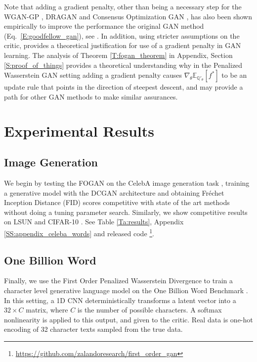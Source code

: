 \documentclass{article}
\begin{document}
 Note that adding a gradient penalty, other than being a necessary step for the WGAN-GP \cite{gulrajani2017improved}, 
 DRAGAN \cite{dragan} and Consensus Optimization GAN \cite{mescheder2017numerics},
 has also been shown empirically to improve the performance the original GAN method (Eq.\ \ref{E:goodfellow_gan}),
 see \cite{fedus2017many}. In addition, using stricter assumptions on the critic, \cite{nagarajan2017gradient} provides a theoretical justification for 
 use of a gradient penalty in GAN learning.
 The analysis of Theorem \ref{T:fogan_theorem} in Appendix, Section \ref{S:proof_of_things} provides a theoretical understanding
 why in the Penalized Wasserstein GAN setting adding a gradient penalty causes $\nabla_\theta\mathbb E_{\mathbb Q'_\theta}[f^*]$
 to be an update rule that points in the direction of steepest descent, and may provide a path for other GAN methods to make similar assurances.

 \section{Experimental Results}\label{S:experiments}

 \subsection{Image Generation}
 We begin by testing the FOGAN on the CelebA image generation task \cite{liu2015deep},
 training a generative model with the DCGAN  architecture \cite{radford2015unsupervised} and obtaining Fr\'echet Inception Distance (FID) scores \cite{heusel2017gans}
 competitive with state of the art methods without doing a tuning parameter search.
 Similarly, we show competitive results on LSUN \cite{yu15lsun} and CIFAR-10 \cite{krizhevsky2009learning}.
 See Table \ref{Ta:results}, Appendix \ref{SS:appendix_celeba_words} and released code
 \footnote{\scriptsize{\url{https://github.com/zalandoresearch/first_order_gan}}}.

 \subsection{One Billion Word}
 Finally, we use the First Order Penalized Wasserstein Divergence to train a character level generative language model on the
 One Billion Word Benchmark \cite{chelba2013one}. In this setting, a 1D CNN deterministically transforms a latent
 vector into a $32\times C$ matrix, where $C$ is the number of possible characters.
 A softmax nonlinearity is applied to this output, and given to the critic.
 Real data is one-hot encoding of 32 character texts sampled from the true data.
 
\end{document}
